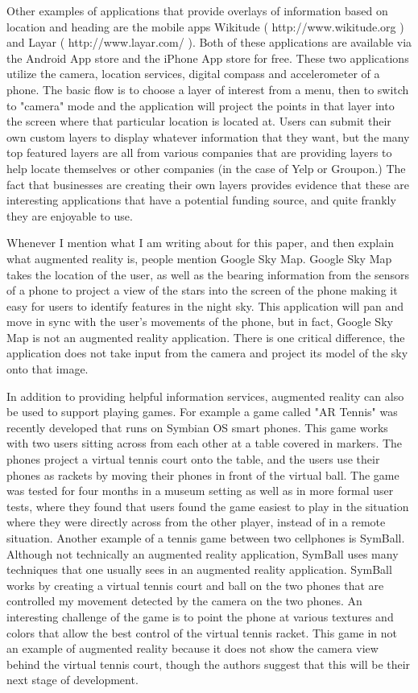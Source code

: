 \documentclass{acm_proc_article-sp}
\begin{document}
Other examples of applications that provide overlays of information based on location and heading are the mobile apps Wikitude ( http://www.wikitude.org ) and Layar ( http://www.layar.com/ ).  Both of these applications are available via the Android App store and the iPhone App store for free.  These two applications utilize the camera, location services, digital compass and accelerometer of a phone.  The basic flow is to choose a layer of interest from a menu, then to switch to "camera" mode and the application will project the points in that layer into the screen where that particular location is located at.  Users can submit their own custom layers to display whatever information that they want, but the many top featured layers are all from various companies that are providing layers to help locate themselves or other companies (in the case of Yelp or Groupon.)  The fact that businesses are creating their own layers provides evidence that these are interesting applications that have a potential funding source, and quite frankly they are enjoyable to use.

Whenever I mention what I am writing about for this paper, and then explain what augmented reality is, people mention Google Sky Map.  Google Sky Map takes the location of the user, as well as the bearing information from the sensors of a phone to project a view of the stars into the screen of the phone making it easy for users to identify features in the night sky. This application will pan and move in sync with the user's movements of the phone, but in fact, Google Sky Map is not an augmented reality application.  There is one critical difference, the application does not take input from the camera and project its model of the sky onto that image. \cite{Ouilhet:2010:GSM:1851600.1851695}

In addition to providing helpful information services, augmented reality can also be used to support playing games.  For example a game called "AR Tennis" was recently developed that runs on Symbian OS smart phones.  This game works with two users sitting across from each other at a table covered in markers.  The phones project a virtual tennis court onto the table, and the users use their phones as rackets by moving their phones in front of the virtual ball.  The game was tested for four months in a museum setting as well as in more formal user tests, where they found that users found the game easiest to play in the situation where they were directly across from the other player, instead of in a remote situation.\cite{henrysson2005face}  Another example of a tennis game between two cellphones is SymBall.  Although not technically an augmented reality application, SymBall uses many techniques that one usually sees in an augmented reality application.  SymBall works by creating a virtual tennis court and ball on the two phones that are controlled my movement detected by the camera on the two phones.  An interesting challenge of the game is to point the phone at various textures and colors that allow the best control of the virtual tennis racket. This game in not an example of augmented reality because it does not show the camera view behind the virtual tennis court, though the authors suggest that this will be their next stage of development. \cite{hakkarainen2005symball} 
\end{document}
